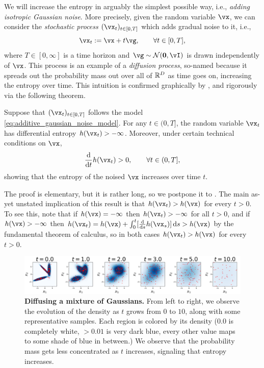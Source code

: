 \documentclass[../../book-main.tex]{subfiles}
\begin{document}
We will increase the entropy in arguably the simplest possible way, i.e., \textit{adding isotropic Gaussian noise}. More precisely, given the random variable \(\vx\), we can consider the \textit{stochastic process} \((\vx_{t})_{t \in [0, T]}\) which adds gradual noise to it, i.e.,
\begin{equation}\label{eq:additive_gaussian_noise_model}
	\vx_{t} := \vx + t\vg, \qquad \forall t \in [0, T],
\end{equation}
where \(T \in [0, \infty]\) is a time horizon and \(\vg \sim \dNorm(\vzero, \vI)\) is drawn independently of \(\vx\). This process is an example of a \textit{diffusion process}, so-named because it spreads out the probability mass out over all of \(\mathbb{R}^{D}\) as time goes on, increasing the entropy over time. This intuition is confirmed graphically by , and rigorously via the following theorem.
\begin{theorem}
	Suppose that \((\vx_{t})_{t \in [0, T]}\) follows the model \eqref{eq:additive_gaussian_noise_model}. For any \(t \in (0, T]\), the random variable \(\vx_{t}\) has differential entropy \(h(\vx_{t}) > -\infty\). Moreover, under certain technical conditions on \(\vx\), 
	\begin{equation}
		\odv*{h(\vx_{t})}{t} > 0, \qquad \forall t \in (0, T],
	\end{equation}
	showing that the entropy of the noised \(\vx\) increases over time \(t\).
\end{theorem}
The proof is elementary, but it is rather long, so we postpone it to . The main as-yet unstated implication of this result is that \(h(\vx_{t}) > h(\vx)\) for every \(t > 0\). To see this, note that if \(h(\vx) = -\infty\) then \(h(\vx_{t}) > -\infty\) for all \(t > 0\),  and if \(h(\vx) > -\infty\) then \(h(\vx_{t}) = h(\vx) + \int_{0}^{t}[\odv*{h(\vx_{s})}{s}]\odif{s} > h(\vx)\) by the fundamental theorem of calculus, so in both cases \(h(\vx_{t}) > h(\vx)\) for every \(t > 0\).

\begin{figure}
	\includegraphics[width=\textwidth]{chapters/chapter3/figs/ve_forward_diffusion_density.png}
	\caption{\small\textbf{Diffusing a mixture of Gaussians.} From left to right, we observe the evolution of the density as \(t\) grows from \(0\) to \(10\), along with some representative samples. Each region is colored by its density (\(0.0\) is completely white, \(> 0.01\) is very dark blue, every other value maps to some shade of blue in between.) We observe that the probability mass gets less concentrated as \(t\) increases, signaling that entropy increases.}
	\label{fig:ve_forward_density}
\end{figure}
\end{document}
